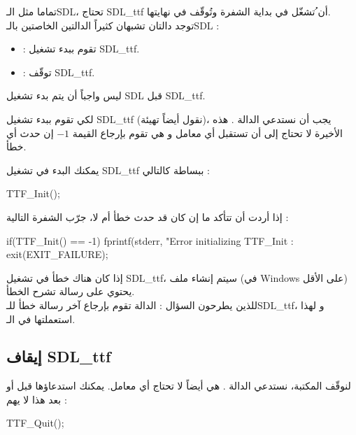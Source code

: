 تماما مثل الـ\textenglish{SDL}،
تحتاج
\textenglish{SDL\_ttf}
أن ُتشغّل في بداية الشفرة وتُوقّف في نهايتها.\\
توجد دالتان تشبهان كثيراً الدالتين الخاصتين بالـ\textenglish{SDL} :

\begin{itemize}
	\item {} :
	تقوم ببدء تشغيل
	\textenglish{SDL\_ttf}.
	\item {} :
	توقّف
	\textenglish{SDL\_ttf}.
\end{itemize}

\begin{information}
ليس واجباً أن يتم بدء تشغيل
\textenglish{SDL}
قبل
\textenglish{SDL\_ttf}.
\end{information}

 لكي تقوم ببدء تشغيل
\textenglish{SDL\_ttf}
(نقول أيضاً تهيئة)، يجب أن نستدعي الدالة
.
هذه الأخيرة لا تحتاج إلى أن تستقبل أي معامل و هي تقوم بإرجاع القيمة
$-1$
إن حدث أي خطأ.

يمكنك البدء في تشغيل
\textenglish{SDL\_ttf}
ببساطة كالتالي :

\begin{Csource}
TTF_Init();
\end{Csource}

إذا أردت أن تتأكد ما إن كان قد حدث خطأ أم لا، جرّب الشفرة التالية :

\begin{Csource}
if(TTF_Init() == -1)
{
	fprintf(stderr, "Error initializing TTF_Init : %
	exit(EXIT_FAILURE);
}
\end{Csource}
إذا كان هناك خطأ في تشغيل
\textenglish{SDL\_ttf}،
سيتم إنشاء ملف
(في
\textenglish{Windows}
على الأقل) يحتوي على رسالة تشرح الخطأ.\\
للذين يطرحون السؤال : الدالة
تقوم بإرجاع آخر رسالة خطأ للـ\textenglish{SDL\_ttf}،
و لهذا استعملتها في الـ.

\subsection{إيقاف \textenglish{SDL\_ttf}}

 لنوقّف المكتبة، نستدعي الدالة
.
هي أيضاً لا تحتاج أي معامل. يمكنك استدعاؤها قبل أو بعد
هذا لا يهم  :

\begin{Csource}
TTF_Quit();
\end{Csource}

